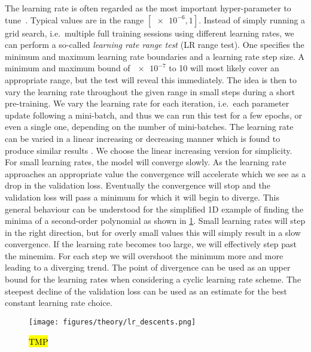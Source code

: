 The learning rate is often regarded as the most important hyper-parameter to
tune~\cite{Bengio2012}. Typical values are in the range $[\num{e-6}, 1]$.
Instead of simply running a grid search, i.e.\ multiple full training sessions
using different learning rates, we can perform a so-called \textit{learning rate
range test} (LR range test). One specifies the minimum and maximum learning rate
boundaries and a learning rate step size. A minimum and maximum bound of
$\num{e-7}$ to 10 will most likely cover an appropriate range, but the test will
reveal this immediately. The idea is then to vary the learning rate throughout
the given range in small steps during a short pre-training. We vary the learning
rate for each iteration, i.e.\ each parameter update following a mini-batch, and
thus we can run this test for a few epochs, or even a single one, depending on
the number of mini-batches. The learning rate can be varied in a linear
increasing or decreasing manner which is found to produce similar results
\cite{smith2017cyclical}. We choose the linear increasing version for
simplicity. For small learning rates, the model will converge slowly. As the
learning rate approaches an appropriate value the convergence will accelerate
which we see as a drop in the validation loss. Eventually the convergence will
stop and the validation loss will pass a minimum for which it will begin to
diverge. This general behaviour can be understood for the simplified 1D example
of finding the minima of a second-order polynomial as shown in
\cref{fig:lr_descents}. Small learning rates will step in the right direction,
but for overly small values this will simply result in a slow convergence. If
the learning rate becomes too large, we will effectively step past the minemim.
For each step we will overshoot the minimum more and more leading to a diverging
trend. The point of divergence can be used as an upper bound for the learning
rates when considering a cyclic learning rate scheme.  The steepest
decline of the validation loss can be used as an estimate for the best constant
learning rate choice. 


\begin{figure}[H]
  \centering
  \texttt{[image: figures/theory/lr\_descents.png]}
  \caption{\hl{TMP}  }
  \label{fig:lr_descents}
\end{figure}


